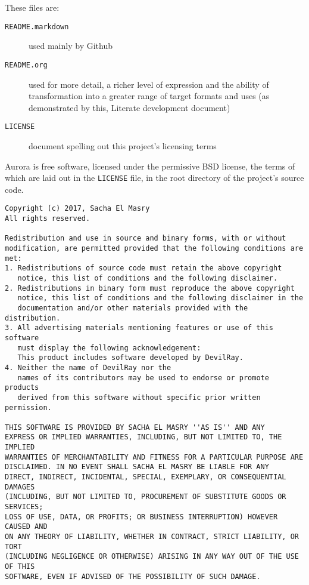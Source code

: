\documentclass{article}
\begin{document}
These files are:

\begin{description}
\item[{\texttt{README.markdown}}] used mainly by Github
\item[{\texttt{README.org}}] used for more detail, a richer level of expression and the
ability of transformation into a greater range of target formats
and uses (as demonstrated by this, Literate development document)
\item[{\texttt{LICENSE}}] document spelling out this project's licensing terms
\end{description}

Aurora is free software, licensed under the permissive BSD license, the terms of
which are laid out in the \texttt{LICENSE} file, in the root directory of the project's
source code.

\begin{verbatim}
Copyright (c) 2017, Sacha El Masry
All rights reserved.

Redistribution and use in source and binary forms, with or without
modification, are permitted provided that the following conditions are met:
1. Redistributions of source code must retain the above copyright
   notice, this list of conditions and the following disclaimer.
2. Redistributions in binary form must reproduce the above copyright
   notice, this list of conditions and the following disclaimer in the
   documentation and/or other materials provided with the distribution.
3. All advertising materials mentioning features or use of this software
   must display the following acknowledgement:
   This product includes software developed by DevilRay.
4. Neither the name of DevilRay nor the
   names of its contributors may be used to endorse or promote products
   derived from this software without specific prior written permission.

THIS SOFTWARE IS PROVIDED BY SACHA EL MASRY ''AS IS'' AND ANY
EXPRESS OR IMPLIED WARRANTIES, INCLUDING, BUT NOT LIMITED TO, THE IMPLIED
WARRANTIES OF MERCHANTABILITY AND FITNESS FOR A PARTICULAR PURPOSE ARE
DISCLAIMED. IN NO EVENT SHALL SACHA EL MASRY BE LIABLE FOR ANY
DIRECT, INDIRECT, INCIDENTAL, SPECIAL, EXEMPLARY, OR CONSEQUENTIAL DAMAGES
(INCLUDING, BUT NOT LIMITED TO, PROCUREMENT OF SUBSTITUTE GOODS OR SERVICES;
LOSS OF USE, DATA, OR PROFITS; OR BUSINESS INTERRUPTION) HOWEVER CAUSED AND
ON ANY THEORY OF LIABILITY, WHETHER IN CONTRACT, STRICT LIABILITY, OR TORT
(INCLUDING NEGLIGENCE OR OTHERWISE) ARISING IN ANY WAY OUT OF THE USE OF THIS
SOFTWARE, EVEN IF ADVISED OF THE POSSIBILITY OF SUCH DAMAGE.
\end{verbatim}
\end{document}
